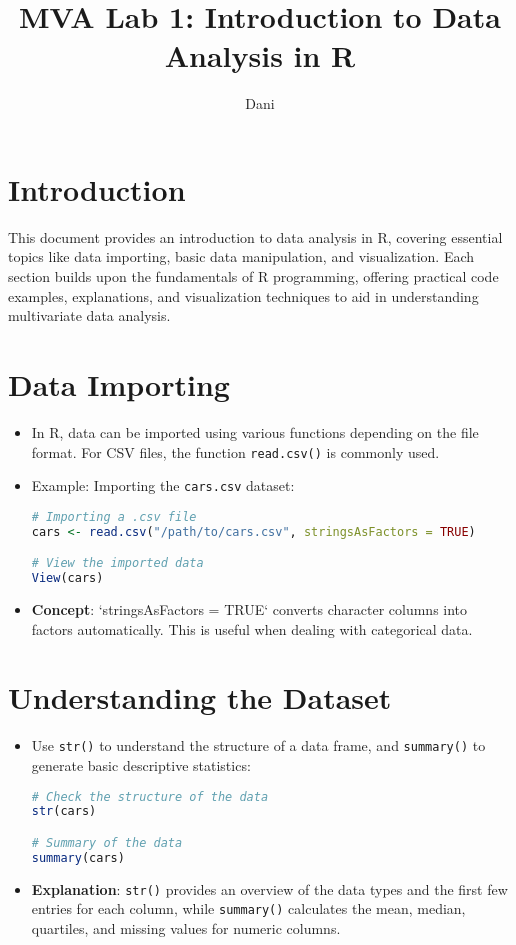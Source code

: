 \documentclass{article}
\title{MVA Lab 1: Introduction to Data Analysis in R}
\author{Dani}
\date{}
\begin{document}
\maketitle

\section{Introduction}
This document provides an introduction to data analysis in R, covering essential topics like data importing, basic data manipulation, and visualization. Each section builds upon the fundamentals of R programming, offering practical code examples, explanations, and visualization techniques to aid in understanding multivariate data analysis.

\section{Data Importing}
\begin{itemize}
    \item In R, data can be imported using various functions depending on the file format. For CSV files, the function \texttt{read.csv()} is commonly used.
    \item Example: Importing the \texttt{cars.csv} dataset:
\begin{lstlisting}[language=R]
# Importing a .csv file
cars <- read.csv("/path/to/cars.csv", stringsAsFactors = TRUE)

# View the imported data
View(cars)
\end{lstlisting}
    \item \textbf{Concept}: `stringsAsFactors = TRUE` converts character columns into factors automatically. This is useful when dealing with categorical data.
\end{itemize}

\section{Understanding the Dataset}
\begin{itemize}
    \item Use \texttt{str()} to understand the structure of a data frame, and \texttt{summary()} to generate basic descriptive statistics:
\begin{lstlisting}[language=R]
# Check the structure of the data
str(cars)

# Summary of the data
summary(cars)
\end{lstlisting}
    \item \textbf{Explanation}: \texttt{str()} provides an overview of the data types and the first few entries for each column, while \texttt{summary()} calculates the mean, median, quartiles, and missing values for numeric columns.
\end{itemize}
\end{document}
